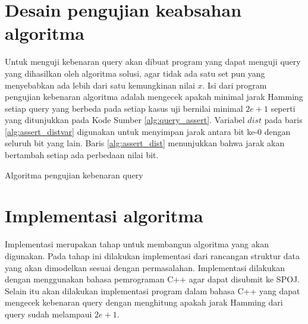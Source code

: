 \section{Desain pengujian keabsahan algoritma}

Untuk menguji kebenaran query akan dibuat program yang dapat menguji query yang dihasilkan oleh algoritma solusi, agar tidak ada satu set pun yang menyebabkan ada lebih dari satu kemungkinan nilai $x$. Isi dari program pengujian kebenaran algoritma adalah mengecek apakah minimal jarak Hamming setiap query yang berbeda pada setiap kasus uji bernilai minimal $2e+1$ seperti yang ditunjukkan pada Kode Sumber \ref{alg:query_assert}. Variabel $dist$ pada baris \ref{alg:assert_distvar} digunakan untuk menyimpan jarak antara bit ke-0 dengan seluruh bit yang lain. Baris \ref{alg:assert_dist} menunjukkan bahwa jarak akan bertambah setiap ada perbedaan nilai bit.

\begin{algorithm}[h]
\caption{Algoritma pengujian kebenaran query}
\label{alg:query_assert}
\end{algorithm}


\section{Implementasi algoritma}

Implementasi merupakan tahap untuk membangun algoritma yang akan digunakan. Pada tahap ini dilakukan implementasi dari rancangan struktur data yang akan dimodelkan sesuai dengan permasalahan. Implementasi dilakukan dengan menggunakan bahasa pemrograman C++ agar dapat disubmit ke SPOJ. Selain itu akan dilakukan implementasi program dalam bahasa C++ yang dapat mengecek kebenaran query dengan menghitung apakah jarak Hamming dari query sudah melampaui $2e+1$.

